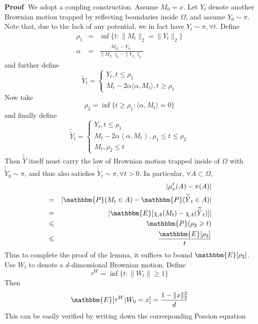 \documentclass[english, aip, jcp, priprint, graphicx,floatfix]{revtex4-1}
\theoremstyle{plain}
\theoremstyle{definition}
\theoremstyle{plain}
\begin{document}
\noindent\textbf{Proof\ }We adopt a coupling construction. Assume $M_0 = x$.
Let $Y_t$ denote another Brownian motion trapped by reflecting boundaries
inside $\Omega$, and assume $Y_0 \sim \pi$. Note that, due to the lack of any
potential, we in fact have $Y_t \sim \pi, \forall t$. Define
\begin{eqnarray*}
\rho_1 & = & \inf \{ t : \| M_t \|_2 = \| Y_t \|_2 \}\\
\alpha & = & \frac{M_{\rho_1} - Y_{\rho_1}}{\| M_{\rho_1} \|_2 - \|
Y_{\rho_1} \|_2}
\end{eqnarray*}
and further define
\[ \tilde{Y}_t = \left\{ \begin{array}{l}
Y_t, t \leqslant \rho_1\\
M_t - 2 \alpha \langle \alpha, M_t \rangle, t \geqslant \rho_1
\end{array} \right. \]
Now take
\[ \rho_2 = \inf \{ t \geqslant \rho_1 : \langle \alpha, M_t \rangle = 0 \} \]
and finally define
\[ \widetilde{\tilde{Y}}_t = \left\{ \begin{array}{l}
Y_t, t \leqslant \rho_1\\
M_t - 2 \alpha \left\langle \alpha, M_{t \,} \right\rangle, \rho_1
\leqslant t \leqslant \rho_2\\
M_t, \rho_2 \leqslant t
\end{array} \right. \]
Then $\widetilde{\tilde{Y}}$ itself must carry the law of Brownian motion
trapped inside of $\Omega$ with $\widetilde{\tilde{Y}}_0 \sim \pi$, and thus
also satisfies $\widetilde{\tilde{Y}}_t \sim \pi, \forall t > 0$. In
particular, $\forall A \subset \Omega$,
\begin{eqnarray*}
&  & | \mu_x^t (A) - \pi (A) |\\
& = & | \mathbbm{P} (M_t \in A) -\mathbbm{P} (\widetilde{\tilde{Y}}_t \in
A) |\\
& = & | \mathbbm{E} [\chi_A (M_t) - \chi_A (\widetilde{\tilde{Y}}_t)] |\\
& \leqslant & \mathbbm{P} (\rho_2 \geqslant t)\\
& \leqslant & \frac{\mathbbm{E} [\rho_2]}{t}
\end{eqnarray*}
Thus to complete the proof of the lemma, it suffices to bound $\mathbbm{E}
[\rho_2]$. Use $W_t$ to denote a $d$-dimensional Brownian motion. Define
\[ \tau^W = \inf \{ t : \| W_t \| \geqslant 1 \} \]
Then
\begin{equation}
\mathbbm{E} [\tau^W |W_0 = x] = \frac{1 - \| x \|_2^2}{d}
\label{equ:expectation}
\end{equation}
This can be easily verified by writing down the corresponding Possion equation
\end{document}
